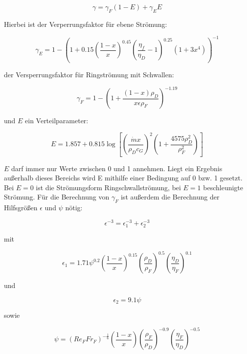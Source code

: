 \begin{equation}
\label{eq:17}
\gamma = \gamma_F(1-E) + \gamma_E E
\end{equation}

Hierbei ist der Verperrungsfaktor für ebene Strömung:

\begin{equation}
\label{eq:18}
\gamma_E = 1 - \left( 1+0.15 \left( \frac{1-x}{x} \right)^{0.45} \left( \frac{\eta_f}{\eta_D}-1 \right)^{0.25} (1 + 3x^4)\right)^{-1}
\end{equation}

der Versperrungsfaktor für Ringströmung mit Schwallen:

\begin{equation}
\label{eq:19}
\gamma_F = 1 - \left(1+\frac{(1-x)\rho_D}{x \epsilon \rho_F}\right)^{-1.19}
\end{equation}


und $E$ ein Verteilparameter:

\begin{equation}
\label{eq:20}
E = 1.857 + 0.815 \log\left[\left(\frac{\dot{m} x}{\rho_D c_G}\right)^2 \left( 1+ \frac{4575 \rho_D^2}{\rho_F^2} \right)\right]
\end{equation}

$E$ darf immer nur Werte zwischen 0 und 1 annehmen. Liegt ein Ergebnis außerhalb dieses Bereichs wird E mithilfe einer Bedingung auf 0 bzw. 1 gesetzt. Bei $E=0$ ist die Strömungsform Ringschwallströmung, bei $E=1$ beschleunigte Strömung.
Für die Berechnung von $\gamma_F$ ist außerdem die Berechnung der Hilfsgrößen $\epsilon$ und $\psi$ nötig:

\begin{equation}
\label{eq:21}
\epsilon^{-3} = \epsilon_1^{-3} + \epsilon_2^{-3}
\end{equation}

mit

\begin{equation}
\label{eq:22}
\epsilon_1 = 1.71 \psi^{0.2} \left( \frac{1-x}{x} \right)^{0.15} \left( \frac{\rho_D}{\rho_F} \right)^{0.5} \left( \frac{\eta_D}{\eta_F} \right)^{0.1}
\end{equation}

und

\begin{equation}
\label{eq:23}
\epsilon_2 = 9.1 \psi
\end{equation}

sowie

\begin{equation}
\label{eq:24}
\psi = (Re_F Fr_F)^{-\frac{1}{6}} \left( \frac{1-x}{x} \right) \left(\frac{\rho_F}{\rho_D} \right)^{-0.9} \left(\frac{\eta_F}{\eta_D} \right)^{-0.5}
\end{equation}

